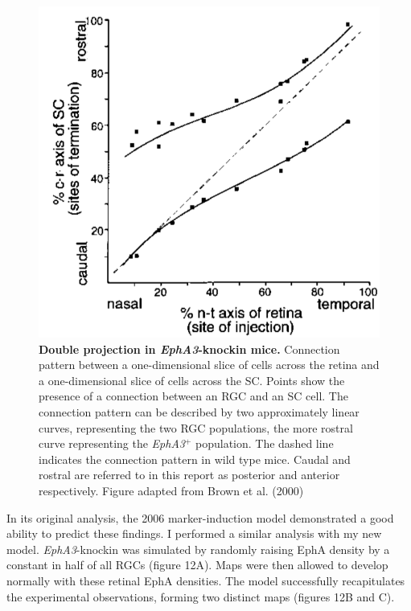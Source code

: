 \documentclass[11pt]{"article"}
\begin{document}
\begin{figure}
\includegraphics[scale=0.3]{Brown}
\caption{\textbf{Double projection in \textit{EphA3}-knockin mice.}
Connection pattern between a one-dimensional slice of cells across the retina and a one-dimensional slice of cells across the SC. Points show the presence of a connection between an RGC and an SC cell. The connection pattern can be described by two approximately linear curves, representing the two RGC populations, the more rostral curve representing the \textit{EphA3}$^+$ population. The dashed line indicates the connection pattern in wild type mice. Caudal and rostral are referred to in this report as posterior and anterior respectively. Figure adapted from Brown et al. (2000)}
\end{figure}

\pagebreak

In its original analysis, the 2006 marker-induction model demonstrated a good ability to predict these findings. I performed a similar analysis with my new model. \textit{EphA3}-knockin was simulated by randomly raising EphA density by a constant in half of all RGCs (figure 12A). Maps were then allowed to develop normally with these retinal EphA densities. The model successfully recapitulates the experimental observations, forming two distinct maps (figures 12B and C).\\
\end{document}
